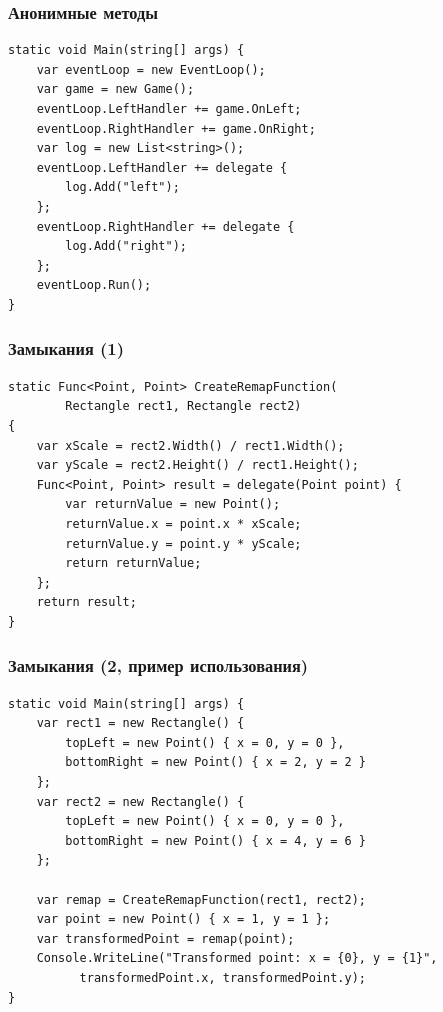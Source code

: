 \documentclass{../../slides-style}
\begin{document}
    \begin{frame}[fragile]
        \frametitle{Анонимные методы}
        \begin{verbatim}
static void Main(string[] args) {
    var eventLoop = new EventLoop();
    var game = new Game();
    eventLoop.LeftHandler += game.OnLeft;
    eventLoop.RightHandler += game.OnRight;
    var log = new List<string>();
    eventLoop.LeftHandler += delegate {
        log.Add("left");
    };
    eventLoop.RightHandler += delegate {
        log.Add("right");
    };
    eventLoop.Run();
}
        \end{verbatim}
    \end{frame}

    \begin{frame}[fragile]
        \frametitle{Замыкания (1)}
        \begin{verbatim}
static Func<Point, Point> CreateRemapFunction(
        Rectangle rect1, Rectangle rect2)
{
    var xScale = rect2.Width() / rect1.Width();
    var yScale = rect2.Height() / rect1.Height();
    Func<Point, Point> result = delegate(Point point) {
        var returnValue = new Point();
        returnValue.x = point.x * xScale;
        returnValue.y = point.y * yScale;
        return returnValue;
    };
    return result;
}
        \end{verbatim}
    \end{frame}

    \begin{frame}[fragile]
        \frametitle{Замыкания (2, пример использования)}
        \begin{small}
            \begin{verbatim}
static void Main(string[] args) {
    var rect1 = new Rectangle() {
        topLeft = new Point() { x = 0, y = 0 },
        bottomRight = new Point() { x = 2, y = 2 }
    };
    var rect2 = new Rectangle() {
        topLeft = new Point() { x = 0, y = 0 },
        bottomRight = new Point() { x = 4, y = 6 }
    };

    var remap = CreateRemapFunction(rect1, rect2);
    var point = new Point() { x = 1, y = 1 };
    var transformedPoint = remap(point);
    Console.WriteLine("Transformed point: x = {0}, y = {1}", 
          transformedPoint.x, transformedPoint.y);
}
            \end{verbatim}
        \end{small}
    \end{frame}
\end{document}
